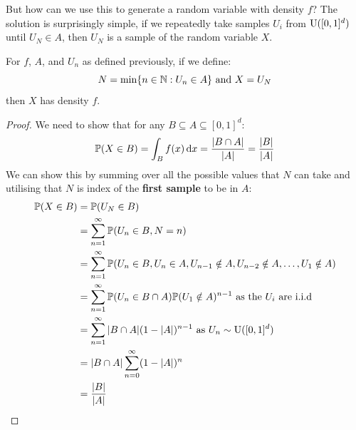 \documentclass[../main.tex]{subfiles}
\begin{document}
But how can we use this to generate a random variable with density $f$?
The solution is surprisingly simple, if we repeatedly take samples $U_i$ from $\operatorname{U}([0, 1]^{d})$ until $U_N \in A$, then $U_N$ is a sample of the random variable $X$.
\begin{proposition}
  For $f$, $A$, and $U_n$ as defined previously, if we define:
  \[
    N = \min\{n \in \mathbb{N}: U_n \in A\} \text{ and } X = U_{N}
  \]
  then $X$ has density $f$.
\end{proposition}
\begin{proof}
  We need to show that for any $B \subseteq A \subseteq [0, 1]^{d}$:
  \[
    \P(X \in B) = \int_{B} f(x) \d{x} = \frac{|B \cap A|}{|A|} = \frac{|B|}{|A|}
  \]
  We can show this by summing over all the possible values that $N$ can take and utilising that $N$ is index of the \textbf{first sample} to be in $A$:
  \begin{align*}
    \mathbb{P}(X \in B) &= \mathbb{P}(U_N \in B) \\
                &= \sum_{n = 1}^{\infty} \mathbb{P}(U_n \in B, N = n) \\
                &= \sum_{n = 1}^{\infty} \mathbb{P}(U_n \in B, U_n \in A, U_{n - 1} \notin A, U_{n - 2} \notin A, \ldots, U_{1} \notin A) \\
                &= \sum_{n = 1}^{\infty} \mathbb{P}(U_{n} \in B \cap A)\mathbb{P}(U_{1} \notin A)^{n - 1} \text{ as the $U_i$ are i.i.d} \\
                &= \sum_{n = 1}^{\infty} |B \cap A| (1 - |A|)^{n - 1} \text{ as $U_{n} \sim \operatorname{U}([0, 1]^{d})$} \\
                &= |B \cap A| \sum_{n = 0}^{\infty} (1 - |A|)^{n} \\
                &= \frac{|B|}{|A|}
  \end{align*}
\end{proof}
\end{document}
